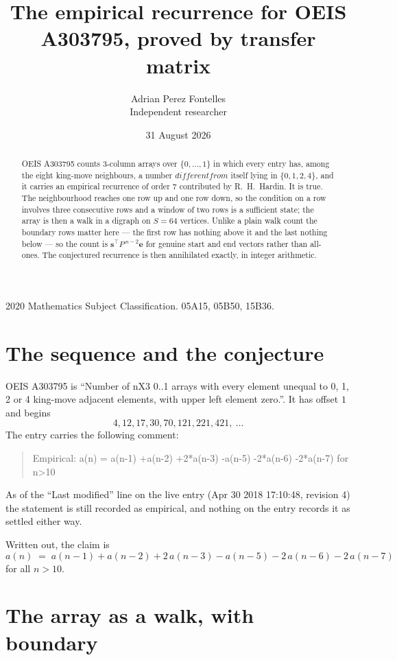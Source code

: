 \documentclass[11pt,a4paper]{article}
\title{The empirical recurrence for OEIS A303795, proved by transfer matrix}
\author{Adrian Perez Fontelles\\ \small Independent researcher}
\date{31 August 2026}
\theoremstyle{plain}
\theoremstyle{definition}
\begin{document}
\maketitle

\begin{abstract}
OEIS A303795 counts $3$-column arrays over $\{0,\dots,1\}$ in which every entry has,
among the eight king-move neighbours, a number $different from$ itself lying in $\{0,1,2,4\}$, and it carries an empirical
recurrence of order $7$ contributed by R.~H.~Hardin. It is true. The neighbourhood
reaches one row up and one row down, so the condition on a row involves three consecutive
rows and a window of two rows is a sufficient state; the array is then a walk in a digraph
on $S=64$ vertices. Unlike a plain walk count the boundary rows matter here --- the first
row has nothing above it and the last nothing below --- so the count is
$\mathbf{s}^{\!\top}P^{\,n-2}\mathbf{e}$ for genuine start and end vectors rather than
all-ones. The conjectured recurrence is then annihilated exactly, in integer arithmetic.
\end{abstract}

\noindent\small 2020 Mathematics Subject Classification. 05A15, 05B50, 15B36.\normalsize

\section{The sequence and the conjecture}

OEIS A303795 is ``Number of nX3 0..1 arrays with every element unequal to 0, 1, 2 or 4 king-move adjacent elements, with upper left element zero.''. It has offset
$1$ and begins
\[
4, 12, 17, 30, 70, 121, 221, 421,\ \dots
\]
The entry carries the following comment:
\begin{quote}\small
Empirical: a(n) = a(n-1) +a(n-2) +2*a(n-3) -a(n-5) -2*a(n-6) -2*a(n-7) for n>10
\end{quote}
As of the ``Last modified'' line on the live entry (Apr 30 2018 17:10:48, revision
4) the statement is still recorded as empirical, and nothing on the entry
records it as settled either way.

Written out, the claim is
\begin{equation}\label{eq:conj}
a(n)\;=\;a(n-1) + a(n-2) + 2\,a(n-3) - a(n-5) - 2\,a(n-6) - 2\,a(n-7)
\end{equation}
for all $n>10$.

\section{The array as a walk, with boundary}
\end{document}
